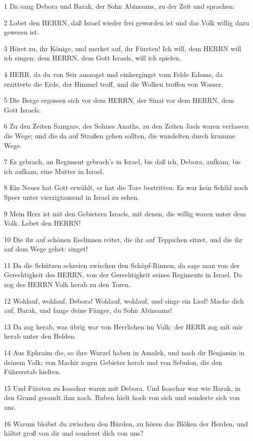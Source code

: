 \par 1 Da sang Debora und Barak, der Sohn Abinoams, zu der Zeit und sprachen:
\par 2 Lobet den HERRN, daß Israel wieder frei geworden ist und das Volk willig dazu gewesen ist.
\par 3 Höret zu, ihr Könige, und merket auf, ihr Fürsten! Ich will, dem HERRN will ich singen; dem HERRN, dem Gott Israels, will ich spielen.
\par 4 HERR, da du von Seir auszogst und einhergingst vom Felde Edoms, da erzitterte die Erde, der Himmel troff, und die Wolken troffen von Wasser.
\par 5 Die Berge ergossen sich vor dem HERRN, der Sinai vor dem HERRN, dem Gott Israels.
\par 6 Zu den Zeiten Samgars, des Sohnes Anaths, zu den Zeiten Jaels waren verlassen die Wege; und die da auf Straßen gehen sollten, die wandelten durch krumme Wege.
\par 7 Es gebrach, an Regiment gebrach's in Israel, bis daß ich, Debora, aufkam, bis ich aufkam, eine Mutter in Israel.
\par 8 Ein Neues hat Gott erwählt, er hat die Tore bestritten. Es war kein Schild noch Speer unter vierzigtausend in Israel zu sehen.
\par 9 Mein Herz ist mit den Gebietern Israels, mit denen, die willig waren unter dem Volk. Lobet den HERRN!
\par 10 Die ihr auf schönen Eselinnen reitet, die ihr auf Teppichen sitzet, und die ihr auf dem Wege gehet: singet!
\par 11 Da die Schützen schreien zwischen den Schöpf-Rinnen, da sage man von der Gerechtigkeit des HERRN, von der Gerechtigkeit seines Regiments in Israel. Da zog des HERRN Volk herab zu den Toren.
\par 12 Wohlauf, wohlauf, Debora! Wohlauf, wohlauf, und singe ein Lied! Mache dich auf, Barak, und fange deine Fänger, du Sohn Abinoams!
\par 13 Da zog herab, was übrig war von Herrlichen im Volk; der HERR zog mit mir herab unter den Helden.
\par 14 Aus Ephraim die, so ihre Wurzel haben in Amalek, und nach dir Benjamin in deinem Volk; von Machir zogen Gebieter herab und von Sebulon, die den Führerstab hielten.
\par 15 Und Fürsten zu Isaschar waren mit Debora. Und Isaschar war wie Barak, in den Grund gesandt ihm nach. Ruben hielt hoch von sich und sonderte sich von uns.
\par 16 Warum bleibst du zwischen den Hürden, zu hören das Blöken der Herden, und hältst groß von dir und sonderst dich von uns?
